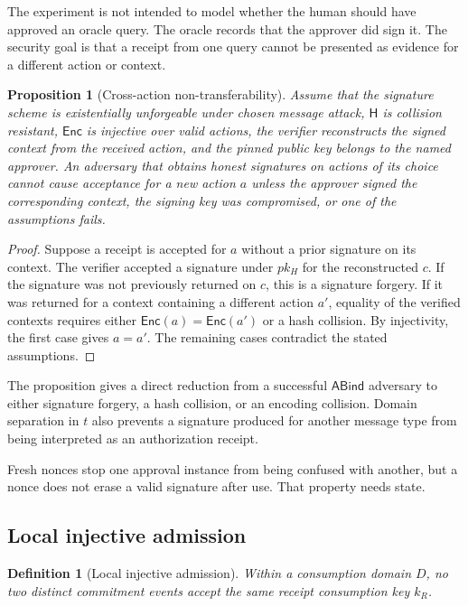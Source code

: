 \documentclass[10.5pt]{article}
\newtheorem{definition}{Definition}
\newtheorem{proposition}{Proposition}
\newcommand{\Enc}{\mathsf{Enc}}
\newcommand{\Hash}{\mathsf{H}}
\begin{document}
The experiment is not intended to model whether the human should have approved
an oracle query. The oracle records that the approver did sign it. The security
goal is that a receipt from one query cannot be presented as evidence for a
different action or context.

\begin{proposition}[Cross-action non-transferability]
Assume that the signature scheme is existentially unforgeable under chosen
message attack, $\Hash$ is collision resistant, $\Enc$ is injective over valid
actions, the verifier reconstructs the signed context from the received action,
and the pinned public key belongs to the named approver. An adversary that obtains
honest signatures on actions of its choice cannot cause acceptance for a new
action $a$ unless the approver signed the corresponding context, the signing key
was compromised, or one of the assumptions fails.
\end{proposition}

\begin{proof}
Suppose a receipt is accepted for $a$ without a prior signature on its context.
The verifier accepted a signature under $pk_H$ for the reconstructed $c$. If the
signature was not previously returned on $c$, this is a signature forgery. If it
was returned for a context containing a different action $a'$, equality of the
verified contexts requires either $\Enc(a)=\Enc(a')$ or a hash collision. By
injectivity, the first case gives $a=a'$. The remaining cases contradict the
stated assumptions.
\end{proof}

The proposition gives a direct reduction from a successful $\mathsf{ABind}$
adversary to either signature forgery, a hash collision, or an encoding collision.
Domain separation in $t$ also prevents a signature produced for another message
type from being interpreted as an authorization receipt.

Fresh nonces stop one approval instance from being confused with another, but a
nonce does not erase a valid signature after use. That property needs state.

\subsection{Local injective admission}

\begin{definition}[Local injective admission]
Within a consumption domain $D$, no two distinct commitment events accept the
same receipt consumption key $k_R$.
\end{definition}
\end{document}
